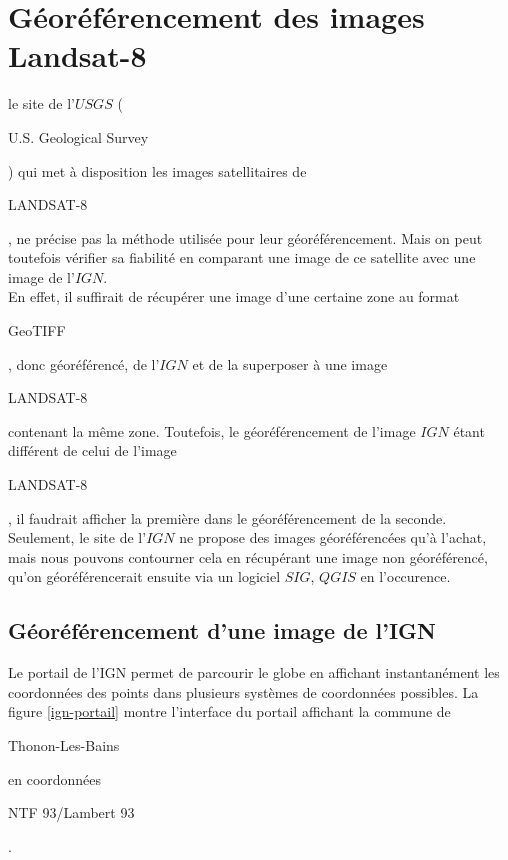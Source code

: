 \documentclass{book}
\begin{document}
\section{Géoréférencement des images Landsat-8}

le site de l'$USGS$ (\begin{itshape}U.S. Geological Survey\end{itshape}) \cite{landsat8} qui met à disposition les images
satellitaires de \begin{itshape}LANDSAT-8\end{itshape}, ne précise pas la méthode utilisée pour leur géoréférencement.
Mais on peut toutefois vérifier sa fiabilité en comparant une image de ce satellite avec une image de 
l'$IGN$.\\
En effet, il suffirait de récupérer une image d'une certaine zone au format \begin{itshape}GeoTIFF\end{itshape}, 
donc géoréférencé, de l'$IGN$ et de la superposer
à une image \begin{itshape}LANDSAT-8\end{itshape} contenant la même zone. Toutefois, le géoréférencement de l'image $IGN$ étant différent
de celui de l'image \begin{itshape}LANDSAT-8\end{itshape}, il faudrait afficher la première dans le géoréférencement de la seconde.\\
Seulement, le site de l'$IGN$ ne propose des images géoréférencées qu'à l'achat, mais nous pouvons contourner cela en récupérant une 
image non géoréférencé, qu'on géoréférencerait ensuite via un logiciel $SIG$, $QGIS$ en l'occurence.\\

\subsection{Géoréférencement d'une image de l'IGN}

Le portail de l'IGN \cite{ign-portail} permet de parcourir le globe en affichant instantanément les coordonnées des points dans 
plusieurs systèmes de coordonnées possibles. La figure \ref{ign-portail} montre l'interface du portail affichant la commune de
\begin{itshape}Thonon-Les-Bains\end{itshape} en coordonnées \begin{itshape}NTF 93/Lambert 93\end{itshape}.
\end{document}

